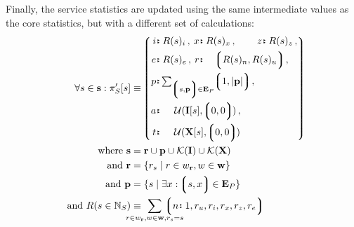 Finally, the service statistics are updated using the same intermediate values as the core statistics, but with a different set of calculations:
\begin{align}
  \forall s \in \mathbf{s} : \pi'_S[s] &\equiv \tup{
    \begin{alignedat}{5}
      \is{i&}{R(s)_i}\,,\;
      \is{&x&}{R(s)_x}\,,\;
      \is{&z&}{R(s)_z}\,,\\
      \is{e&}{R(s)_e}\,,\;
      \is{&r&}{\span\span\tup{R(s)_n, R(s)_u}}\,,\;\\
      \is{p&}{\span\span \textstyle \sum_{\tup{s, \mathbf{p}} \in \mathbf{E}_P} \tup{1, \len{\mathbf{p}}}}\,,\;\\
      \is{a&}{\span\span \subifnone(\mathbf{I}[s], \tup{0, 0})}\,,\; \ \ \\
      \is{t&}{\span\span \subifnone(\mathbf{X}[s], \tup{0, 0})} \quad\\
    \end{alignedat}
  }\!\!\!\!\\
  \where \mathbf{s} &= \mathbf{r} \cup \mathbf{p} \cup \Fkeys{\mathbf{I}} \cup \Fkeys{\mathbf{X}}\\
  \also \mathbf{r} &= \{r_s \mid r \in w_\mathbf{r}, w \in \mathbf{w} \}\\
  \also \mathbf{p} &= \{s \mid \exists x: \tup{s, x} \in \mathbf{E}_P \}\\
  \also R(s \in \N_S) &\equiv \!\!\!\!\!\!\!\!\!\!\!
    \sum_{r \in w_\mathbf{r}, w \in \mathbf{w}, r_s = s}\!\!\!\!\!\!\!\!\!\!\!
    \tup{\is{n}{1}, r_u, r_i, r_x, r_z, r_e}
\end{align}
